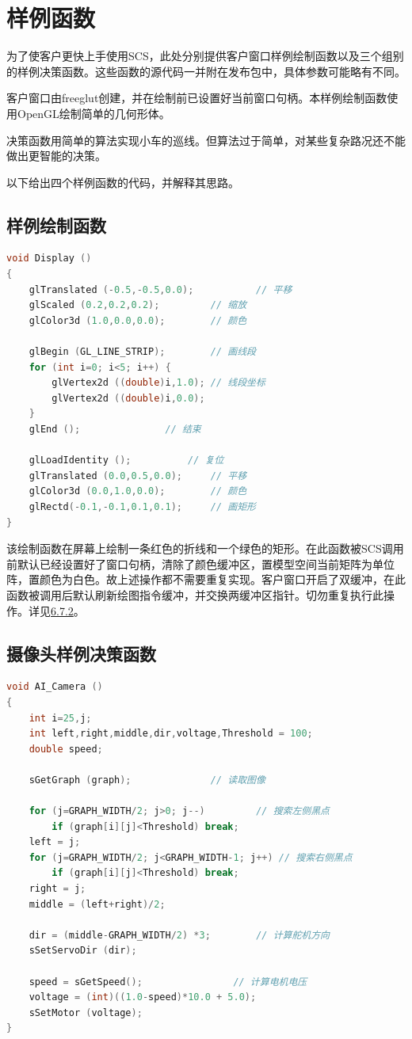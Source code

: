 \documentclass[titlepage,a4paper]{ctexart}
\begin{document}
\section{样例函数}
为了使客户更快上手使用SCS，此处分别提供客户窗口样例绘制函数以及三个组别的样例决策函数。这些函数的源代码一并附在发布包中，具体参数可能略有不同。

客户窗口由freeglut创建，并在绘制前已设置好当前窗口句柄。本样例绘制函数使用OpenGL绘制简单的几何形体。

决策函数用简单的算法实现小车的巡线。但算法过于简单，对某些复杂路况还不能做出更智能的决策。

以下给出四个样例函数的代码，并解释其思路。

\subsection{样例绘制函数}

\begin{lstlisting}[language=C++]
void Display ()
{
	glTranslated (-0.5,-0.5,0.0);           // 平移
	glScaled (0.2,0.2,0.2);			// 缩放
	glColor3d (1.0,0.0,0.0);		// 颜色
	
	glBegin (GL_LINE_STRIP);		// 画线段
	for (int i=0; i<5; i++) {
		glVertex2d ((double)i,1.0);	// 线段坐标
		glVertex2d ((double)i,0.0);
	}
	glEnd ();				// 结束

	glLoadIdentity ();			// 复位
	glTranslated (0.0,0.5,0.0);		// 平移
	glColor3d (0.0,1.0,0.0);		// 颜色
	glRectd(-0.1,-0.1,0.1,0.1);		// 画矩形
}
\end{lstlisting}

该绘制函数在屏幕上绘制一条红色的折线和一个绿色的矩形。在此函数被SCS调用前默认已经设置好了窗口句柄，清除了颜色缓冲区，置模型空间当前矩阵为单位阵，置颜色为白色。故上述操作都不需要重复实现。客户窗口开启了双缓冲，在此函数被调用后默认刷新绘图指令缓冲，并交换两缓冲区指针。切勿重复执行此操作。详见\hyperlink{h672}{6.7.2}。\\

\newpage
\subsection{摄像头样例决策函数}
\begin{lstlisting}[language=C++]
void AI_Camera ()
{
	int i=25,j;
	int left,right,middle,dir,voltage,Threshold = 100;
	double speed;

	sGetGraph (graph);			    // 读取图像

	for (j=GRAPH_WIDTH/2; j>0; j--)		    // 搜索左侧黑点
		if (graph[i][j]<Threshold) break;
	left = j;
	for (j=GRAPH_WIDTH/2; j<GRAPH_WIDTH-1; j++) // 搜索右侧黑点
		if (graph[i][j]<Threshold) break;
	right = j;
	middle = (left+right)/2;

	dir = (middle-GRAPH_WIDTH/2) *3;	    // 计算舵机方向
	sSetServoDir (dir);
	
	speed = sGetSpeed();			    // 计算电机电压
	voltage = (int)((1.0-speed)*10.0 + 5.0);
	sSetMotor (voltage);
}
\end{lstlisting}
\end{document}
